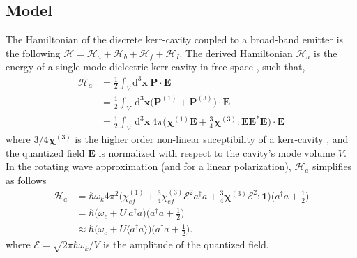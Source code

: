 \documentclass[12pt]{article}
\begin{document}
\subsection{Model}
The Hamiltonian of the discrete kerr-cavity coupled to a broad-band emitter is
the following $\mathcal{H} = \mathcal{H}_{a} + \mathcal{H}_{b} + 
\mathcal{H}_{f} + \mathcal{H}_{I}$. The derived Hamiltonian $\mathcal{H}_{a}$ 
is the energy of a single-mode dielectric kerr-cavity in free space 
\cite{jackson1999classical}, such that,
\begin{equation}
\begin{split}
\mathcal{H}_{a} &= \frac{1}{2} 
    \int_{V} \mathrm{d}^{3}\mathbf{x} \: \mathbf{P} \cdot \mathbf{E}
\\
&= \frac{1}{2} 
    \int_{V} \: \mathrm{d}^{3}\mathbf{x}
    \Big( \mathbf{P}^{(1)} + \mathbf{P}^{(3)} \Big)
    \cdot \mathbf{E}
\\
&= \frac{1}{2} 
    \int_{V} \: \mathrm{d}^{3}\mathbf{x} \: 4\pi 
    \Big( \bm\chi^{(1)} \mathbf{E}  + 
    \frac{3}{4}\bm\chi^{(3)}:\mathbf{E}\mathbf{E}^{*} \mathbf{E} \Big)
    \cdot \mathbf{E}
\end{split}
\end{equation}
where $3/4\mathbf{\chi}^{(3)}$ is the higher order non-linear suceptibility of
a kerr-cavity \cite{butcher1990elements}, and the quantized field $\mathbf{E}$
is normalized with respect to the cavity's mode volume $V$. In the rotating
wave approximation (and for a linear polarization), $\mathcal{H}_{a}$
simplifies as follows
\begin{equation}
\begin{split}
\mathcal{H}_{a} &= \hbar\omega_k 4\pi^{2} \Big(
    \chi^{(1)}_{ef} +
    \frac{3}{4} \chi^{(3)}_{ef} \mathcal{E}^2
    a^{\dagger}a + \frac{3}{4}\bm\chi^{(3)} \mathcal{E}^2 : \mathbf{1} \Big)
    \Big( a^{\dagger}a + \frac{1}{2} \Big)
\\
&= \hbar \Big( \omega_c + U\:a^{\dagger}a \Big)
    \Big( a^{\dagger}a + \frac{1}{2} \Big)
\\  
&\approx \hbar \Big( \omega_c + U \langle a^{\dagger}a \rangle \Big)
    \Big( a^{\dagger}a + \frac{1}{2} \Big).
\end{split}
\end{equation}
where $\mathcal{E} = \sqrt{2\pi \hbar \omega_k / V }$ is the amplitude of the
quantized field.
\end{document}
